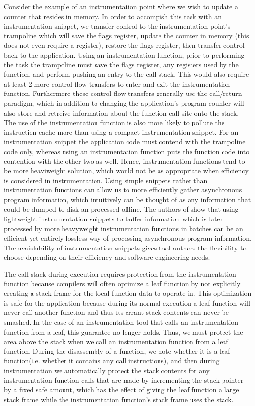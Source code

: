 Consider the example of an instrumentation point where we wish to update a counter that resides in memory. 
In order to accompish this task with an instrumentation snippet, we transfer control to the
instrumentation point's trampoline which will save the flags register, update the counter in memory (this does not even require a register), restore
the flags register, then transfer control back to the application. Using an instrumentation function, prior to performing
the task the trampoline must save the flags register, any registers used by the function, and perform pushing an entry to the call stack.  
This would also require at least 2 more control flow transfers to enter and exit the instrumentation function. 
Furthermore these control flow transfers generally use the call/return paradigm, which in addition to changing the
application's program counter will also store and retreive information about the function call site onto the stack. 
The use of the instrumentation function is also more likely to pollute the instruction cache more than using a compact
instrumentation snippet. For an instrumentation snippet the application code must contend with the trampoline code
only, whereas using an instrumentation function puts the function code into contention with the other two as well. Hence, 
instrumentation functions tend to be more heaviweight solution, which would not be as appropriate when efficiency is considered
in instrumentation. Using simple snippets rather than instrumentation functions can allow us to more efficiently gather asynchronous program information, 
which intuitively can be thought of as any information that could be dumped to
disk an processed offline. The authors of \cite{gao2005aliter} show that using lightweight instrumentation snippets to buffer information
which is later processed by more heavyweight instrumentation functions in batches can be an efficient yet entirely lossless way of processing asynchronous
program information. The avaialability of instrumentation snippets gives tool authors the flexibility to choose 
depending on their efficiency and software engineering needs.

The call stack during execution requires protection from the instrumentation function because compilers will often optimize a leaf function
by not explicitly creating a stack frame for the local function data to operate in. This optimization is safe for the application because during its
normal execution a leaf function will never call another function and thus its errant stack contents can never be smashed. In the case of an instrumentation
tool that calls an instrumentation function from a leaf, this guarantee no longer holds. Thus, we must protect the area above the stack when we call
an instrumentation function from a leaf function. During the disassembly of a function, we note whether it is a leaf function(i.e. whether it contains any call
instructions), and then during instrumentation we automatically protect the stack contents for any instrumentation function calls that are made by
incrementing the stack pointer by a fixed safe amount, which has the effect of giving the leaf function a large stack frame while the instrumentation
function's stack frame uses the stack.
